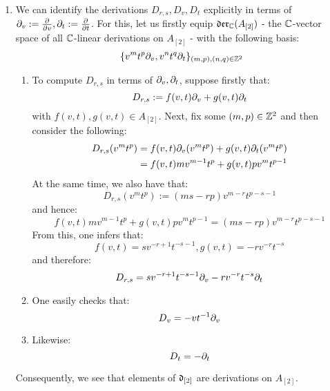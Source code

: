         \begin{remark} \label{remark: dual_of_toroidal_centres_contains_derivations}
            \begin{enumerate}
                \item We can identify the derivations $D_{r, s}, D_v, D_t$ explicitly in terms of $\partial_v := \frac{\partial}{\partial v}, \partial_t := \frac{\partial}{\partial t}$. For this, let us firstly equip $\mathfrak{der}_{\mathbb{C}}(A_{[2]})$ - the $\mathbb{C}$-vector space of all $\mathbb{C}$-linear derivations on $A_{[2]}$ - with the following basis:
                    $$\{ v^m t^p \partial_v, v^n t^q \partial_t \}_{(m, p), (n, q) \in \mathbb{Z}^2}$$
                \begin{enumerate}
                    \item To compute $D_{r, s}$ in terms of $\partial_v, \partial_t$, suppose firstly that:
                        $$D_{r, s} := f(v, t) \partial_v + g(v, t) \partial_t$$
                    with $f(v, t), g(v, t) \in A_{[2]}$. Next, fix some $(m, p) \in \mathbb{Z}^2$ and then consider the following:
                        $$
                            \begin{aligned}
                                D_{r, s}( v^m t^p ) & = f(v, t) \partial_v( v^m t^p ) + g(v, t) \partial_t( v^m t^p )
                                \\
                                & = f(v, t) m v^{m - 1} t^p + g(v, t) p v^m t^{p - 1}
                            \end{aligned}
                        $$
                    At the same time, we also have that:
                        $$D_{r, s}(v^m t^p) := ( ms - rp ) v^{m - r} t^{p - s - 1}$$
                    and hence:
                        $$f(v, t) m v^{m - 1} t^p + g(v, t) p v^m t^{p - 1} = ( ms - rp ) v^{m - r} t^{p - s - 1}$$
                    From this, one infers that:
                        $$f(v, t) = s v^{-r + 1} t^{-s - 1}, g(v, t) = -r v^{-r} t^{-s}$$
                    and therefore:
                        $$D_{r, s} = s v^{-r + 1} t^{-s - 1} \partial_v - r v^{-r} t^{-s} \partial_t$$
                    \item One easily checks that:
                        $$D_v = -v t^{-1} \partial_v$$
                    \item Likewise:
                        $$D_t = -\partial_t$$
                \end{enumerate}
                Consequently, we see that elements of $\mathfrak{d}_{[2]}$ are derivations on $A_{[2]}$.
    

\end{enumerate}
\end{remark}
